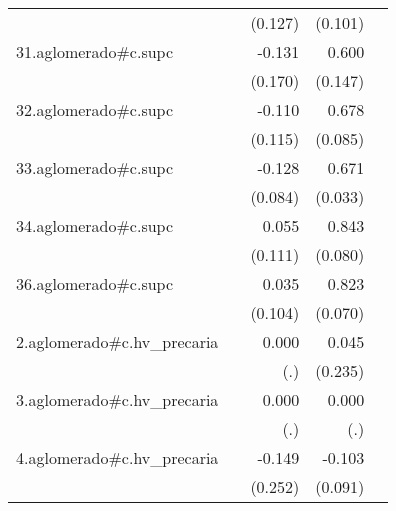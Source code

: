 {\begin{longtable}{l*{4}{D{.}{.}{-1}}}
            &                     &     (0.127)         &     (0.101)         &                     \\
\addlinespace
31.aglomerado#c.supc&                     &      -0.131         &       0.600\sym{***}&                     \\
            &                     &     (0.170)         &     (0.147)         &                     \\
\addlinespace
32.aglomerado#c.supc&                     &      -0.110         &       0.678\sym{***}&                     \\
            &                     &     (0.115)         &     (0.085)         &                     \\
\addlinespace
33.aglomerado#c.supc&                     &      -0.128         &       0.671\sym{***}&                     \\
            &                     &     (0.084)         &     (0.033)         &                     \\
\addlinespace
34.aglomerado#c.supc&                     &       0.055         &       0.843\sym{***}&                     \\
            &                     &     (0.111)         &     (0.080)         &                     \\
\addlinespace
36.aglomerado#c.supc&                     &       0.035         &       0.823\sym{***}&                     \\
            &                     &     (0.104)         &     (0.070)         &                     \\
\addlinespace
2.aglomerado#c.hv\_precaria&                     &       0.000         &       0.045         &                     \\
            &                     &         (.)         &     (0.235)         &                     \\
\addlinespace
3.aglomerado#c.hv\_precaria&                     &       0.000         &       0.000         &                     \\
            &                     &         (.)         &         (.)         &                     \\
\addlinespace
4.aglomerado#c.hv\_precaria&                     &      -0.149         &      -0.103         &                     \\
            &                     &     (0.252)         &     (0.091)         &                     \\

\end{longtable}}

